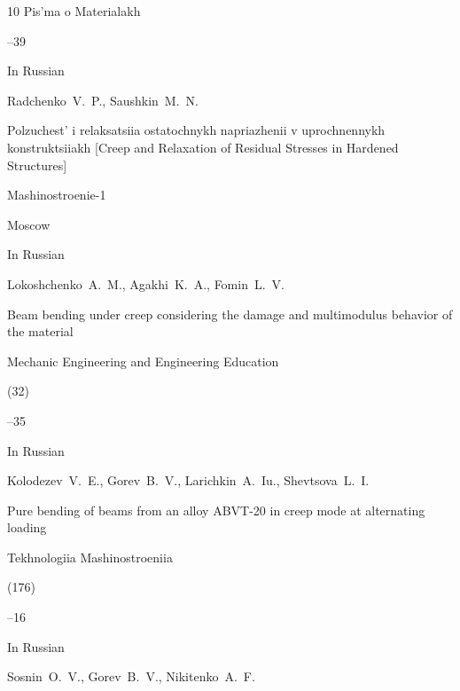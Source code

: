 \begin{thebibliography}{10}
\jour Pis'ma o Materialakh




--39






\lang In Russian

\by Radchenko~V.~P., Saushkin~M.~N.

\book Polzuchest' i relaksatsiia  ostatochnykh napriazhenii v uprochnennykh konstruktsiiakh \rm [Creep and Relaxation of Residual Stresses in Hardened Structures]


\publ Mashinostroenie-1

\publaddr Moscow







\lang In Russian

\by Lokoshchenko~A.~M., Agakhi~K.~A., Fomin~L.~V.

\paper Beam bending under creep considering the damage and multimodulus behavior of the material

\jour Mechanic Engineering and Engineering Education 


(32)

--35






\lang In Russian

\by  Kolodezev~V.~E., Gorev~B.~V., Larichkin~A.~Iu., Shevtsova~L.~I.

\paper Pure bending of beams from an alloy ABVT-20 in creep mode at alternating loading

\jour Tekhnologiia Mashinostroeniia


(176)

--16






\lang In Russian

\by Sosnin~O.~V., Gorev~B.~V., Nikitenko~A.~F.  


\end{thebibliography}
